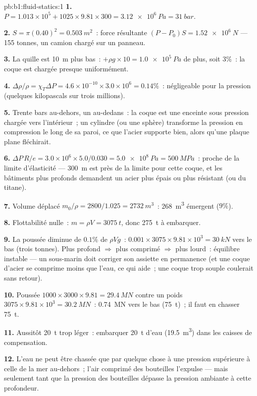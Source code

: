 \begin{solution}{pb:b1:fluid-statics:1}
\textbf{1.} $P = 1.013\times10^5 + 1025 \times 9.81 \times 300 = \qty{3.12e6}{Pa}
= \qty{31}{bar}$.

\textbf{2.} $S = \pi(0.40)^2 = \qty{0.503}{m^2}$~: force résultante $(P - P_0)S =
\qty{1.52e6}{N}$ --- 155 tonnes, un camion chargé sur un panneau.

\textbf{3.} La quille est \qty{10}{m} plus bas~: $+\rho g \times 10 = \qty{1.0e5}{Pa}$ de plus,
soit $3\%$~: la coque est chargée presque uniformément.

\textbf{4.} $\Delta\rho/\rho = \chi_T\Delta P = 4.6\times10^{-10} \times 3.0\times10^6
= 0.14\%$~: négligeable pour la pression (quelques kilopascals sur trois
millions).

\textbf{5.} Trente bars au-dehors, un au-dedans~: la coque est une enceinte
sous pression chargée vers l'intérieur~; un cylindre (ou une sphère) transforme
la pression en compression le long de sa paroi, ce que l'acier supporte bien,
alors qu'une plaque plane fléchirait.

\textbf{6.} $\Delta P\,R/e = 3.0\times10^6 \times 5.0/0.030 = \qty{5.0e8}{Pa}
= \qty{500}{MPa}$~: proche de la limite d'élasticité --- \qty{300}{m} est près
de la limite pour cette coque, et les bâtiments plus profonds demandent un
acier plus épais ou plus résistant (ou du titane).

\textbf{7.} Volume déplacé $m_0/\rho = 2800/1.025 = \qty{2732}{m^3}$~: \qty{268}{m^3}
émergent ($9\%$).

\textbf{8.} Flottabilité nulle~: $m = \rho V = \qty{3075}{t}$, donc \qty{275}{t} à embarquer.

\textbf{9.} La poussée diminue de $0.1\%$ de $\rho Vg$~: $0.001 \times 3075 \times 9.81
\times10^3 = \qty{30}{kN}$ vers le bas (trois tonnes). Plus profond $\Rightarrow$ plus
comprimé $\Rightarrow$ plus lourd~: équilibre instable --- un sous-marin doit corriger
son assiette en permanence (et une coque d'acier se comprime moins que l'eau,
ce qui aide~; une coque trop souple coulerait sans retour).

\textbf{10.} Poussée $1000 \times 3000 \times 9.81 = \qty{29.4}{MN}$ contre un poids
$3075 \times 9.81 \times 10^3 = \qty{30.2}{MN}$~: \qty{0.74}{MN} vers le bas
(\qty{75}{t})~; il faut en chasser \qty{75}{t}.

\textbf{11.} Aussitôt \qty{20}{t} trop léger~: embarquer \qty{20}{t} d'eau
(\qty{19.5}{m^3}) dans les caisses de compensation.

\textbf{12.} L'eau ne peut être chassée que par quelque chose à une pression
supérieure à celle de la mer au-dehors~; l'air comprimé des bouteilles l'expulse
--- mais seulement tant que la pression des bouteilles dépasse la pression
ambiante à cette profondeur.


\end{solution}
